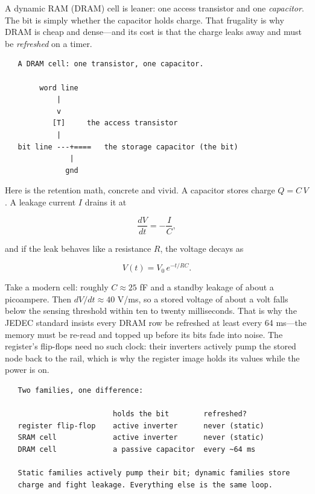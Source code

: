 A dynamic RAM (DRAM) cell is leaner: one access transistor and one
\emph{capacitor}. The bit is simply whether the capacitor holds
charge. That frugality is why DRAM is cheap and dense---and its cost
is that the charge leaks away and must be \emph{refreshed} on a
timer.

\begin{verbatim}
   A DRAM cell: one transistor, one capacitor.

        word line
            |
            v
           [T]     the access transistor
            |
   bit line ---+====   the storage capacitor (the bit)
               |
              gnd
\end{verbatim}

Here is the retention math, concrete and vivid. A capacitor stores
charge $Q = C\,V$. A leakage current $I$ drains it at

\begin{equation}
\frac{dV}{dt} = -\frac{I}{C},
\end{equation}

and if the leak behaves like a resistance $R$, the voltage decays as

\begin{equation}
V(t) = V_0\,e^{-t/RC}.
\end{equation}

Take a modern cell: roughly $C \approx 25$ fF and a standby leakage
of about a picoampere. Then $dV/dt \approx 40$ V/ms, so a stored
voltage of about a volt falls below the sensing threshold within ten
to twenty milliseconds. That is why the JEDEC standard insists every
DRAM row be refreshed at least every 64 ms---the memory must be
re-read and topped up before its bits fade into noise. The register's
flip-flops need no such clock: their inverters actively pump the
stored node back to the rail, which is why the register image holds
its values while the power is on.

\begin{verbatim}
   Two families, one difference:

                         holds the bit        refreshed?
   register flip-flop    active inverter      never (static)
   SRAM cell             active inverter      never (static)
   DRAM cell             a passive capacitor  every ~64 ms

   Static families actively pump their bit; dynamic families store
   charge and fight leakage. Everything else is the same loop.
\end{verbatim}

